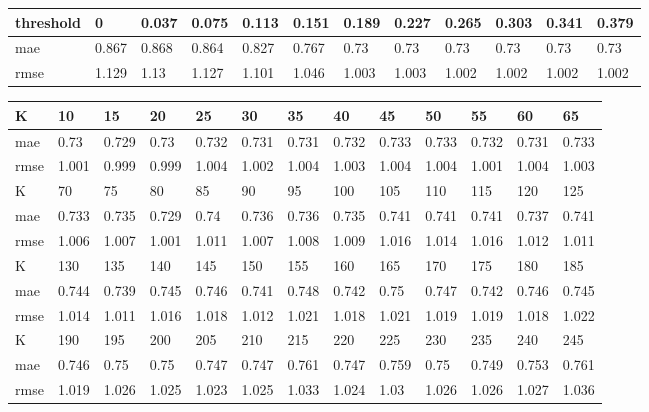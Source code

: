 \begin{appendices}
\begin{center}\label{tab14}
	\begin{tabularx}{\textwidth}{|l|X|X|X|X|X|X|X|X|X|X|X|}
		\hline
		threshold & 0 & 0.037 & 0.075 & 0.113 & 0.151 & 0.189 & 0.227 & 0.265 & 0.303 & 0.341 & 0.379 \\ \hline
		mae & 0.867 & 0.868 & 0.864 & 0.827 & 0.767 & 0.73 & 0.73 & 0.73 & 0.73 & 0.73 & 0.73 \\ \hline
		rmse & 1.129 & 1.13 & 1.127 & 1.101 & 1.046 & 1.003 & 1.003 & 1.002 & 1.002 & 1.002 & 1.002 \\ \hline
	\end{tabularx}	
\end{center}
\begin{center} \label{tab15}
	\begin{tabularx}{\textwidth}{|l|X|X|X|X|X|X|X|X|X|X|X|X|} 
		\hline 
		K & 10 & 15 & 20 & 25 & 30 & 35 & 40 & 45 & 50 & 55 & 60 & 65 \\ \hline 
		mae & 0.73 & 0.729 & 0.73 & 0.732 & 0.731 & 0.731 & 0.732 & 0.733 & 0.733 & 0.732 & 0.731 & 0.733 \\ \hline 
		rmse & 1.001 & 0.999 & 0.999 & 1.004 & 1.002 & 1.004 & 1.003 & 1.004 & 1.004 & 1.001 & 1.004 & 1.003 \\ \hline 
		\hline 
		K & 70 & 75 & 80 & 85 & 90 & 95 & 100 & 105 & 110 & 115 & 120 & 125 \\ \hline 
		mae & 0.733 & 0.735 & 0.729 & 0.74 & 0.736 & 0.736 & 0.735 & 0.741 & 0.741 & 0.741 & 0.737 & 0.741 \\ \hline 
		rmse & 1.006 & 1.007 & 1.001 & 1.011 & 1.007 & 1.008 & 1.009 & 1.016 & 1.014 & 1.016 & 1.012 & 1.011 \\ \hline 
		\hline 
		K & 130 & 135 & 140 & 145 & 150 & 155 & 160 & 165 & 170 & 175 & 180 & 185 \\ \hline 
		mae & 0.744 & 0.739 & 0.745 & 0.746 & 0.741 & 0.748 & 0.742 & 0.75 & 0.747 & 0.742 & 0.746 & 0.745 \\ \hline 
		rmse & 1.014 & 1.011 & 1.016 & 1.018 & 1.012 & 1.021 & 1.018 & 1.021 & 1.019 & 1.019 & 1.018 & 1.022 \\ \hline 
		\hline 
		K & 190 & 195 & 200 & 205 & 210 & 215 & 220 & 225 & 230 & 235 & 240 & 245 \\ \hline 
		mae & 0.746 & 0.75 & 0.75 & 0.747 & 0.747 & 0.761 & 0.747 & 0.759 & 0.75 & 0.749 & 0.753 & 0.761 \\ \hline 
		rmse & 1.019 & 1.026 & 1.025 & 1.023 & 1.025 & 1.033 & 1.024 & 1.03 & 1.026 & 1.026 & 1.027 & 1.036 \\ \hline 

\end{tabularx}
\end{center}
\end{appendices}

